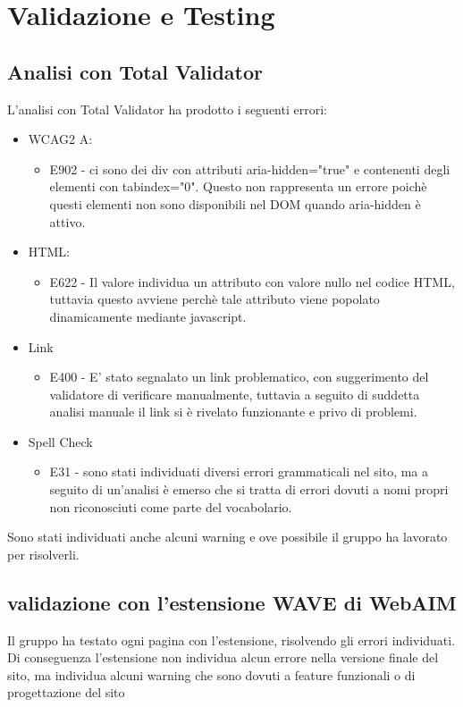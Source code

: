 \section{Validazione e Testing}
\subsection{Analisi con Total Validator}
L'analisi con Total Validator ha prodotto i seguenti errori:
\begin{itemize}
    \item WCAG2 A:
    \begin{itemize}
        \item E902 - ci sono dei div con attributi aria-hidden="true" e contenenti degli elementi con tabindex="0". Questo non rappresenta un errore poichè questi elementi non sono disponibili nel DOM quando aria-hidden è attivo.
    \end{itemize}
    \item HTML:
    \begin{itemize}
        \item E622 - Il valore individua un attributo con valore nullo nel codice HTML, tuttavia questo avviene perchè tale attributo viene popolato dinamicamente mediante javascript.
    \end{itemize}
    \item Link
    \begin{itemize}
        \item E400 - E' stato segnalato un link problematico, con suggerimento del validatore di verificare manualmente, tuttavia a seguito di suddetta analisi manuale il link si è rivelato funzionante e privo di problemi.
    \end{itemize}
    \item Spell Check 
    \begin{itemize}
        \item E31 - sono stati individuati diversi errori grammaticali nel sito, ma a seguito di un'analisi è emerso che si tratta di errori dovuti a nomi propri non riconosciuti come parte del vocabolario.
    \end{itemize}
\end{itemize}
Sono stati individuati anche alcuni warning e ove possibile il gruppo ha lavorato per risolverli.
\subsection{validazione con l'estensione WAVE di WebAIM}
Il gruppo ha testato ogni pagina con l'estensione, risolvendo gli errori individuati. Di conseguenza l'estensione non individua alcun errore nella versione finale del sito, ma individua alcuni warning che sono dovuti a feature funzionali o di progettazione del sito
